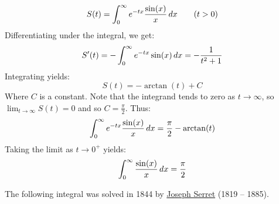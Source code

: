 \documentclass[main.tex]{subfiles}
\begin{document}
\begin{example}
    \begin{equation*}
        S(t) = \int_0^\infty e^{-tx}\frac{\sin(x)}{x}\,dx \tag{$t>0$}
    \end{equation*}
    Differentiating under the integral, we get:
    \begin{equation*}
        S'(t)
        = -\int_0^\infty e^{-tx}\sin(x)\,dx
        = -\frac{1}{t^2+1}
    \end{equation*}
    Integrating yields:
    \begin{equation*}
        S(t) = -\arctan(t) + C
    \end{equation*}
    Where $C$ is a constant. Note that the integrand tends to zero as $t\to\infty$, so $\lim_{t\to\infty} S(t)=0$ and so $C=\frac{\pi}{2}$. Thus:
    \begin{equation*}
        \int_0^\infty e^{-tx}\frac{\sin(x)}{x}\,dx
        = \frac{\pi}{2}-\arctan(t)
    \end{equation*}
    Taking the limit as $t\to0^+$ yields:
    \begin{equation*}
        \int_0^\infty \frac{\sin(x)}{x}\,dx = \frac{\pi}{2}
    \end{equation*}
\end{example}

The following integral was solved in 1844 by \href{https://mathshistory.st-andrews.ac.uk/Biographies/Serret/}{Joseph Serret} (1819 -- 1885).
\end{document}
